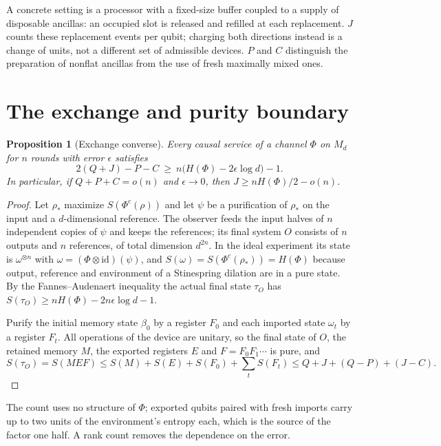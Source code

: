 \documentclass[11pt,a4paper]{article}
\theoremstyle{plain}
\newtheorem{proposition}[theorem]{Proposition}
\theoremstyle{definition}
\theoremstyle{remark}
\begin{document}
A concrete setting is a processor with a fixed-size buffer coupled to a supply of disposable ancillas: an occupied slot is released and refilled at each replacement.
$J$ counts these replacement events per qubit; charging both directions instead is a change of units, not a different set of admissible devices.
$P$ and $C$ distinguish the preparation of nonflat ancillas from the use of fresh maximally mixed ones.



\section{The exchange and purity boundary}\label{sec:purity}


\begin{proposition}[Exchange converse]\label{prop:exchange}
Every causal service of a channel $\Phi$ on $M_d$ for $n$ rounds with error $\epsilon$ satisfies
\[
2(Q+J)-P-C\ \ge\ n\big(H(\Phi)-2\epsilon\log d\big)-1 .
\]
In particular, if $Q+P+C=o(n)$ and $\epsilon\to0$, then $J\ge nH(\Phi)/2-o(n)$.
\end{proposition}

\begin{proof}
Let $\rho_*$ maximize $S(\Phi^c(\rho))$ and let $\psi$ be a purification of $\rho_*$ on the input and a
$d$-dimensional reference. The observer feeds the input halves of $n$ independent copies of $\psi$ and keeps the
references; its final system $O$ consists of $n$ outputs and $n$ references, of total dimension $d^{2n}$. In the ideal
experiment its state is $\omega^{\otimes n}$ with $\omega=(\Phi\otimes\mathrm{id})(\psi)$, and $S(\omega)=S(\Phi^c(\rho_*))=H(\Phi)$
because output, reference and environment of a Stinespring dilation are in a pure state. By the Fannes--Audenaert
inequality the actual final state $\tau_O$ has $S(\tau_O)\ge nH(\Phi)-2n\epsilon\log d-1$.

Purify the initial memory state $\beta_0$ by a register $F_0$ and each imported state $\omega_t$ by a register $F_t$.
All operations of the device are unitary, so the final state of $O$, the retained memory $M$, the exported registers
$E$ and $F=F_0F_1\cdots$ is pure, and
\[
S(\tau_O)=S(MEF)\le S(M)+S(E)+S(F_0)+\sum_tS(F_t)\le Q+J+(Q-P)+(J-C).
\]
\end{proof}

The count uses no structure of $\Phi$; exported qubits paired with fresh imports carry up to two units of the
environment's entropy each, which is the source of the factor one half. A rank count removes the dependence on the
error.
\end{document}

